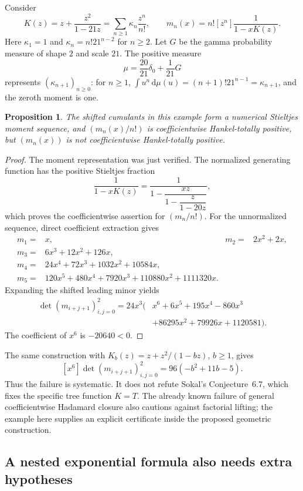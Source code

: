 \documentclass[11pt,a4paper]{article}
\newtheorem{proposition}[theorem]{Proposition}
\theoremstyle{definition}
\theoremstyle{remark}
\newcommand{\dd}{\,\mathrm d}
\numberwithin{equation}{section}
\begin{document}
Consider
\[
 K(z)=z+\frac{z^2}{1-21z}
     =\sum_{n\ge1}\kappa_n\frac{z^n}{n!},\qquad
 m_n(x)=n![z^n]\frac1{1-xK(z)}.
\]
Here $\kappa_1=1$ and $\kappa_n=n!21^{n-2}$ for $n\ge2$.
Let $G$ be the gamma probability measure of shape $2$ and scale $21$.
The positive measure
\[
 \mu=\frac{20}{21}\delta_0+\frac1{21}G
\]
represents $(\kappa_{n+1})_{n\ge0}$: for $n\ge1$,
$\int u^n\dd\mu(u)=(n+1)!21^{n-1}=\kappa_{n+1}$, and the
zeroth moment is one.

\begin{proposition}
The shifted cumulants in this example form a numerical Stieltjes moment
sequence, and $(m_n(x)/n!)$ is coefficientwise Hankel-totally positive,
but $(m_n(x))$ is not coefficientwise Hankel-totally positive.
\end{proposition}
\begin{proof}
The moment representation was just verified. The normalized generating
function has the positive Stieltjes fraction
\[
 \frac1{1-xK(z)}
 =\frac1{1-\dfrac{xz}{1-\dfrac{z}{1-20z}}},
\]
which proves the coefficientwise assertion for $(m_n/n!)$.
For the unnormalized sequence, direct coefficient extraction gives
\begin{align*}
 m_1={}&x, & m_2={}&2x^2+2x,\\
 m_3={}&6x^3+12x^2+126x,\\
 m_4={}&24x^4+72x^3+1032x^2+10584x,\\
 m_5={}&120x^5+480x^4+7920x^3+110880x^2+1111320x.
\end{align*}
Expanding the shifted leading minor yields
\begin{align*}
 \det(m_{i+j+1})_{i,j=0}^{2}
 =24x^3\big(&x^6+6x^5+195x^4-860x^3\\
            &+86295x^2+79926x+1120581\big).
\end{align*}
The coefficient of $x^6$ is $-20640<0$.
\end{proof}

The same construction with $K_b(z)=z+z^2/(1-bz)$, $b\ge1$, gives
\[
 [x^6]\det(m_{i+j+1})_{i,j=0}^{2}=96(-b^2+11b-5).
\]
Thus the failure is systematic. It does not refute Sokal's
Conjecture~6.7, which fixes the specific tree function $K=T$.
The already known failure of general coefficientwise Hadamard closure
also cautions against factorial lifting; the example here supplies an
explicit certificate inside the proposed geometric construction.

\subsection{A nested exponential formula also needs extra hypotheses}
\end{document}
